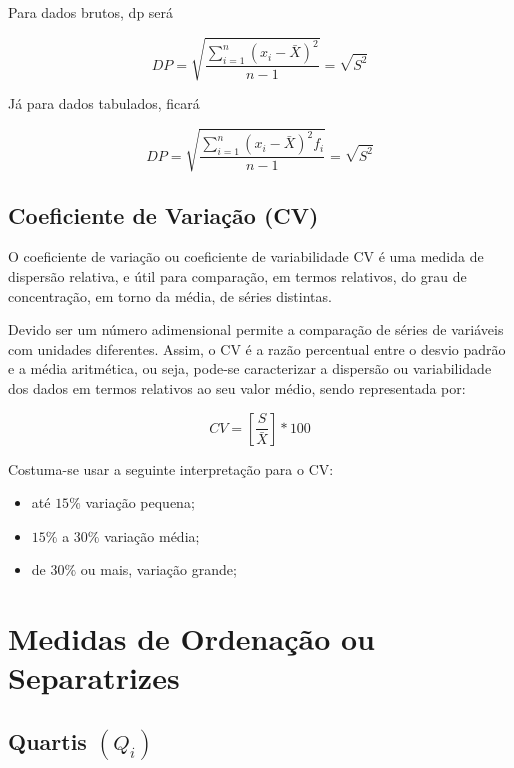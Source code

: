 Para dados brutos, dp será

\begin{equation}\label{dp}
    DP= \sqrt{\frac{\sum_{i=1}^{n}(x_{i}-\bar{X})^{2}}{n-1}} = \sqrt{S^{2}}
\end{equation}

Já para dados tabulados, ficará

\begin{equation}\label{dp}
    DP= \sqrt{\frac{\sum_{i=1}^{n}(x_{i}-\bar{X})^{2}f_{i}}{n-1}} = \sqrt{S^{2}}
\end{equation}

\subsection{Coeficiente de Variação (CV)}

O coeficiente de variação ou coeficiente de variabilidade CV é uma medida de dispersão relativa, e útil para comparação, em termos relativos, do grau de concentração, em torno da média, de séries distintas.\vskip0.3cm 

Devido ser um número adimensional permite a comparação de séries de variáveis com unidades diferentes. Assim, o CV é a razão percentual entre o desvio padrão e a média aritmética, ou seja, pode-se caracterizar a dispersão ou variabilidade dos dados em termos relativos ao seu valor médio, sendo representada por:


\begin{equation}\label{CV}
    CV= \left[ \frac{S}{\bar{X}} \right]*100
\end{equation}

Costuma-se usar  a seguinte interpretação para o CV:

\begin{itemize}
\item até $15\%$ variação pequena;
\item $15\%$ a $30\%$ variação média;
\item de $30\%$ ou mais, variação grande; 
\end{itemize}

\newpage

\section{Medidas de Ordenação ou Separatrizes}
\subsection{Quartis $(Q_{i})$}






